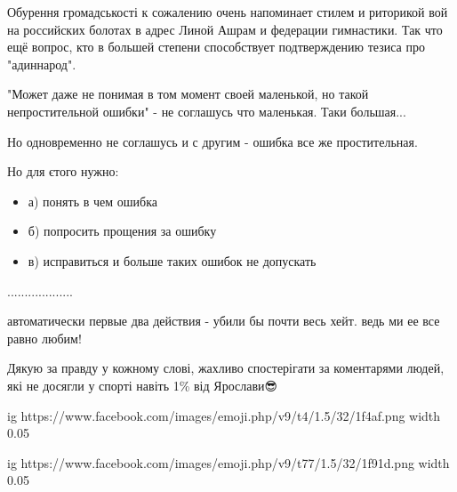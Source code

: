 \begin{itemize}
Обурення громадськості к сожалению очень напоминает стилем и риторикой вой на
российских болотах в адрес Линой Ашрам и федерации гимнастики. Так что ещё
вопрос, кто в большей степени способствует подтверждению тезиса про
"адиннарод".


 

"Может даже не понимая в том момент своей маленькой, но такой непростительной
ошибки" - не соглашусь что маленькая. Таки большая...

Но одновременно не соглашусь и с другим - ошибка все же простительная.

Но для єтого нужно:

\begin{itemize}
  \item а) понять в чем ошибка
  \item б) попросить прощения за ошибку
  \item в) исправиться и больше таких ошибок не допускать
\end{itemize}

...................

автоматически первые два действия - убили бы почти весь хейт. ведь ми ее все равно любим!

 
Дякую за правду у кожному слові, жахливо спостерігати за коментарями людей, які не досягли у спорті навіть 1\% від Ярослави😎

 

\ifcmt
  ig https://www.facebook.com/images/emoji.php/v9/t4/1.5/32/1f4af.png
  width 0.05

	ig https://www.facebook.com/images/emoji.php/v9/t77/1.5/32/1f91d.png
  width 0.05
\fi


 


\end{itemize}
